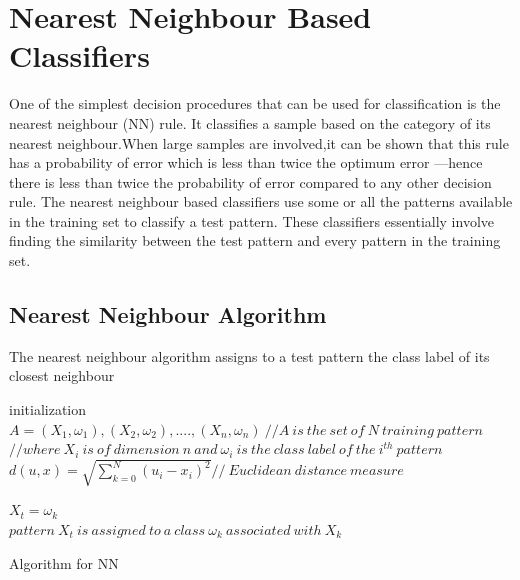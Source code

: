 \par
\par

\section{Nearest Neighbour Based Classifiers}
One of the simplest decision procedures that can be used for classification is the
nearest neighbour (NN) rule. It classifies a sample based on the category of its nearest
neighbour.When large samples are involved,it can be shown that this rule has a
probability of error which is less than twice the optimum error
—hence there is less
than twice the probability of error compared to any other decision rule. The nearest
neighbour based classifiers use some or all the patterns available in the training set
to classify a test pattern. These classifiers essentially involve finding the similarity
between the test pattern and every pattern in the training set.

\subsection{Nearest Neighbour Algorithm}
The nearest neighbour algorithm assigns to a test pattern the class label of its closest
neighbour


\begin{algorithm}[H]
\SetAlgoLined

 initialization\;
 $ A=(X_{1},\omega_{1}),(X_{2},\omega_{2}),....,(X_{n},\omega_{n}) \ // A\ is\ the\ set\ of\ N\ training\ pattern $\\
 
 
$ //where\  X_{i}\ is\ of\ dimension\ n\ and\  \omega_{i}\ is\ the\ class\ label\ of\ the\ i^{th}\ pattern $\\
 
 
 $d(u,x) = \sqrt{\sum_{k=0}^{N} (u_{i}-x_{i})^{2}}  // \ Euclidean\ distance\ measure $\\ 

 
 $ X_{t} = \omega_{k} $ \\
 
 $ pattern\ X_{t}\ is\ assigned\ to\ a\ class\ \omega_{k}\ associated\ with\  X_{k} $
 
 \caption{Algorithm for NN}
\end{algorithm}

